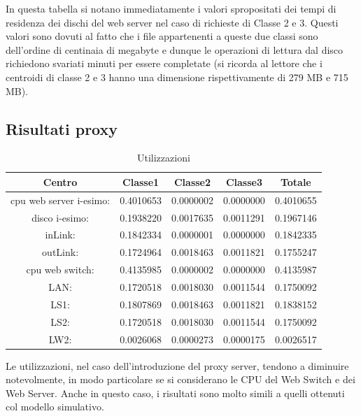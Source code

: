 In questa tabella si notano immediatamente i valori spropositati dei tempi di residenza dei dischi del web server nel caso di richieste di Classe 2 e 3. Questi valori sono dovuti al fatto che i file appartenenti a queste due classi sono dell'ordine di centinaia di megabyte e dunque le operazioni di lettura dal disco richiedono svariati minuti per essere completate (si ricorda al lettore che i centroidi di classe 2 e 3 hanno una dimensione rispettivamente di 279 MB e 715 MB).

\subsection{Risultati proxy}
\begin{table}[H]
\begin{center}
\begin{tabular}{||c|c|c|c|c||}
\hline
Centro &Classe1 &Classe2 &Classe3 &Totale\\
\hline
\hline
 cpu web server i-esimo: 	&0.4010653	&0.0000002	&0.0000000	&0.4010655	\\\hline
 disco i-esimo: 	&0.1938220	&0.0017635	&0.0011291	&0.1967146	\\\hline
 inLink: 	&0.1842334	&0.0000001	&0.0000000	&0.1842335	\\\hline
 outLink: 	&0.1724964	&0.0018463	&0.0011821	&0.1755247	\\\hline
 cpu web switch: 	&0.4135985	&0.0000002	&0.0000000	&0.4135987	\\\hline
 LAN: 	&0.1720518	&0.0018030	&0.0011544	&0.1750092	\\\hline
 LS1: 	&0.1807869	&0.0018463	&0.0011821	&0.1838152	\\\hline
 LS2:	&0.1720518	&0.0018030	&0.0011544	&0.1750092	\\\hline
 LW2: 	&0.0026068	&0.0000273	&0.0000175	&0.0026517	\\\hline
\end{tabular}
\end{center}
\caption{Utilizzazioni}
\label{utilizzazioni}
\end{table}
Le utilizzazioni, nel caso dell'introduzione del proxy server, tendono a diminuire notevolmente, in modo particolare se si considerano le CPU del Web Switch e dei Web Server. Anche in questo caso, i risultati sono molto simili a quelli ottenuti col modello simulativo.
